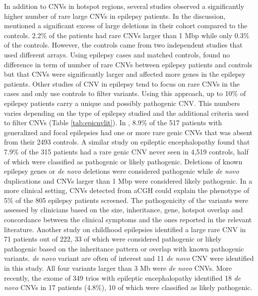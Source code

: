In addition to CNVs in hotspot regions, several studies observed a significantly higher number of rare large CNVs in epilepsy patients.
In the discussion, \citet{Mefford2011} mentioned a significant excess of large deletions in their cohort compared to the controls.
2.2\% of the patients had rare CNVs larger than 1 Mbp while only 0.3\% of the controls.
However, the controls came from two independent studies that used different arrays. %
Using epilepsy cases and matched controls, \citet{Striano2012} found no difference in term of number of rare CNVs between epilepsy patients and controls but that CNVs were significantly larger and affected more genes in the epilepsy patients.
Other studies of CNV in epilepsy tend to focus on rare CNVs in the cases and only use controls to filter variants.
Using this approach, up to 10\% of epilepsy patients carry a unique and possibly pathogenic CNV.
This numbers varies depending on the type of epilepsy studied and the additional criteria used to filter CNVs (Table \ref{tab:epicnvlit}).
In \citet{Mefford2010}, 8.9\% of the 517 patients with generalized and focal epilepsies had one or more rare genic CNVs that was absent from their 2493 controls. %
A similar study on epileptic encephalopathy found that 7.9\% of the 315 patients had a rare genic CNV never seen in 4,519 controls, half of which were classified as pathogenic or likely pathogenic\cite{Mefford2011}.
Deletions of known epilepsy genes or {\it de novo} deletions were considered pathogenic while {\it de novo} duplications and CNVs larger than 1 Mbp were considered likely pathogenic.
In a more clinical setting, CNVs detected from aCGH could explain the phenotype of 5\% of the 805 epilepsy patients screened\cite{Olson2014}.
The pathogenicity of the variants were assessed by clinicians based on the size, inheritance, gene, hotspot overlap and concordance between the clinical symptoms and the ones reported in the relevant literature.
Another study on childhood epilepsies identified a large rare CNV in 71 patients out of 222, 33 of which were considered pathogenic or likely pathogenic based on the inheritance pattern or overlap with known pathogenic variants\cite{Helbig2014}.
{\it de novo} variant are often of interest and 11 {\it de novo} CNV were identified in this study.
All four variants larger than 3 Mb were {\it de novo} CNVs.
More recently, the exome of 349 trios with epileptic encephalopathy identified 18 {\it de novo} CNVs in 17 patients (4.8\%), 10 of which were classified as likely pathogenic\cite{Mefford2015}.

